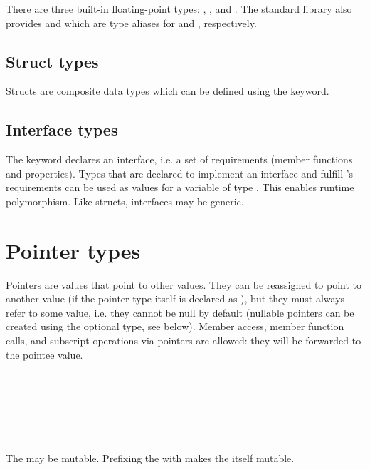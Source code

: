 There are three built-in floating-point types: , ,
and . The standard library also provides  and
 which are type aliases for  and ,
respectively.

\subsection{Struct types}

Structs are composite data types which can be defined using the 
keyword.

\subsection{Interface types}

The  keyword declares an interface, i.e. a set of requirements
(member functions and properties). Types that are declared to implement an
interface  and fulfill 's requirements can be used as values for
a variable of type . This enables runtime polymorphism. Like structs,
interfaces may be generic.

\section{Pointer types}

Pointers are values that point to other values. They can be reassigned to point
to another value (if the pointer type itself is declared as ), but
they must always refer to some value, i.e. they cannot be null by default
(nullable pointers can be created using the optional type, see below). Member
access, member function calls, and subscript operations via pointers are
allowed: they will be forwarded to the pointee value.

\begin{grammar}
\rule{pointer-type}  \code{*}\\
\rule{pointer-type}   \code{*}\\
\rule{pointee-type} 
\end{grammar}

The  may be mutable. Prefixing the \code{*} with
 makes the  itself mutable.

